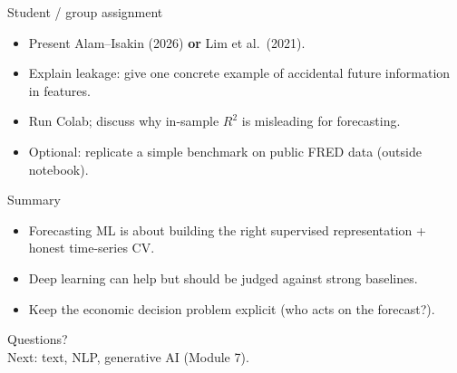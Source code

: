 \documentclass[aspectratio=169,11pt]{beamer}
\begin{document}
\begin{frame}{Student / group assignment}
  \begin{itemize}
    \item Present Alam--Isakin (2026) \textbf{or} Lim et al.\ (2021).
    \item Explain leakage: give one concrete example of accidental future information in features.
    \item Run Colab; discuss why in-sample \(R^2\) is misleading for forecasting.
    \item Optional: replicate a simple benchmark on public FRED data (outside notebook).
  \end{itemize}
\end{frame}

\begin{frame}{Summary}
  \begin{itemize}
    \item Forecasting ML is about building the right supervised representation + honest time-series CV.
    \item Deep learning can help but should be judged against strong baselines.
    \item Keep the economic decision problem explicit (who acts on the forecast?).
  \end{itemize}
\end{frame}

\begin{frame}[plain]
  \begin{center}
    \Large Questions?\\[0.8em]
    \normalsize Next: text, NLP, generative AI (Module 7).
  \end{center}
\end{frame}
\end{document}
